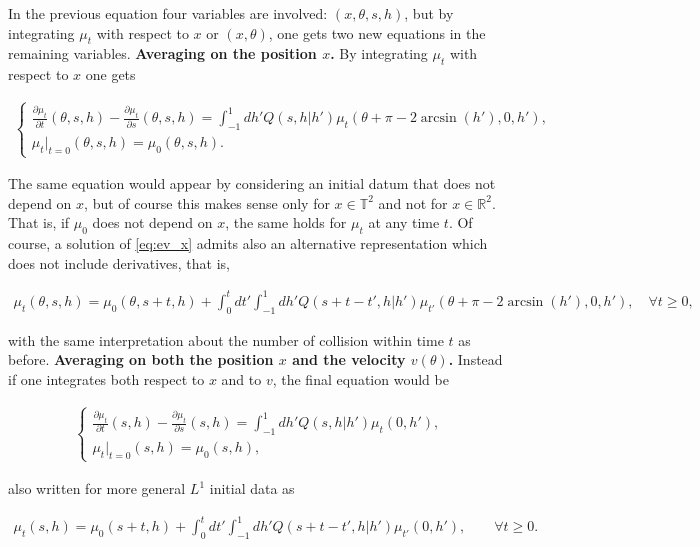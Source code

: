 \documentclass[a4paper,10pt,reqno]{amsart}
\numberwithin{equation}{subsection}
\numberwithin{figure}{subsection}
\begin{document}
In the previous equation four variables are involved: $(x,\theta,s,h)$, but by integrating $\mu_t$ with respect to $x$ or $(x,\theta)$, one gets two new equations in the remaining variables.
\newline
\textbf{Averaging on the position $x$.} By integrating $\mu_t$ with respect to $x$ one gets

\begin{align}\label{eq:ev_x}
\left\{\begin{array}{lcr}\frac{\partial\mu_t}{\partial t}(\theta,s,h)-\frac{\partial\mu_t}{\partial s}(\theta,s,h)=\int_{-1}^1dh' Q(s,h|h')\mu_t(\theta+\pi-2\arcsin(h'),0,h'),\\\mu_t|_{t=0}(\theta,s,h)=\mu_0(\theta,s,h).\end{array}\right.
\end{align}

The same equation would appear by considering an initial datum that does not depend on $x$, but of course this makes sense only for $x\in\mathbb{T}^2$ and not for $x\in\mathbb{R}^2$. That is, if $\mu_0$ does not depend on $x$, the same holds for $\mu_t$ at any time $t$. Of course, a solution of \eqref{eq:ev_x} admits also an alternative representation which does not include derivatives, that is,

{\scriptsize\begin{align}\label{rapp:ev_x}
\mu_t(\theta,s,h)=\mu_0(\theta,s+t,h)+\int_0^tdt'\int_{-1}^1dh'Q(s+t-t',h|h')\mu_{t'}(\theta+\pi-2\arcsin(h'),0,h'),\quad\forall t\geq0,
\end{align}}

with the same interpretation about the number of collision within time $t$ as before.
\newline
\textbf{Averaging on both the position $x$ and the velocity $v(\theta)$.}  Instead if one integrates both respect to $x$ and to $v$, the final equation would be

\begin{align}\label{eq:ev_x,v}
\left\{\begin{array}{lcr}\frac{\partial\mu_t}{\partial t}(s,h)-\frac{\partial\mu_t}{\partial s}(s,h)=\int_{-1}^1dh' Q(s,h|h')\mu_t(0,h'),\\\mu_t|_{t=0}(s,h)=\mu_0(s,h),\end{array}\right.
\end{align}

also written for more general $L^1$ initial data as

\begin{align}\label{rapp:ev_x,v}
\mu_t(s,h)=\mu_0(s+t,h)+\int_0^tdt'\int_{-1}^1dh'Q(s+t-t',h|h')\mu_{t'}(0,h'),\qquad\forall t\geq0.
\end{align}
\end{document}
